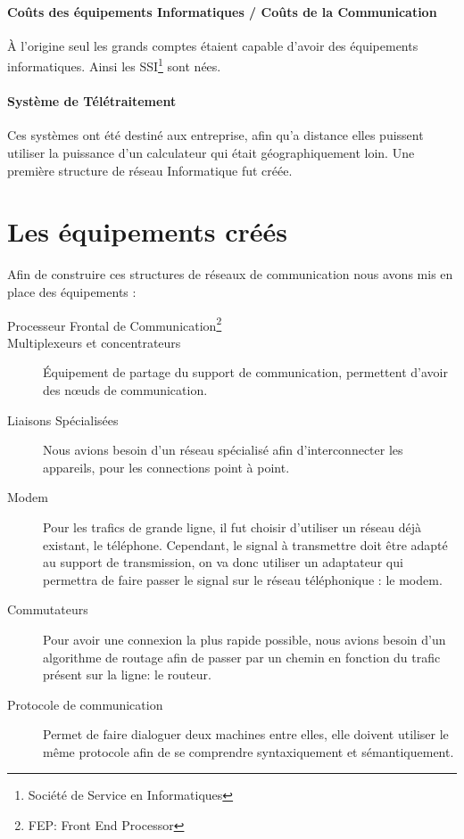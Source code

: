 \documentclass[12pt,a4paper,openany]{book}
\begin{document}
			\paragraph{Coûts des équipements Informatiques / Coûts de la Communication} À l'origine seul les grands comptes étaient capable d'avoir des équipements informatiques. Ainsi les SSI\footnote{Société de Service en Informatiques} sont nées.
			\paragraph{Système de Télétraitement} Ces systèmes ont été destiné aux entreprise, afin qu'a distance elles puissent utiliser la puissance d'un calculateur qui était géographiquement loin. Une première structure de réseau Informatique fut créée.

			\section{Les équipements créés}
			Afin de construire ces structures de réseaux de communication nous avons mis en place des équipements :
			\begin{description}
				\item[Processeur Frontal de Communication\footnote{FEP: Front End Processor}]
				\item[Multiplexeurs et concentrateurs] Équipement de partage du support de communication, permettent d'avoir des nœuds de communication.
				\item[Liaisons Spécialisées] Nous avions besoin d'un réseau spécialisé afin d'interconnecter les appareils, pour les connections point à point.
				\item[Modem] Pour les trafics de grande ligne, il fut choisir d'utiliser un réseau déjà existant, le téléphone.
			Cependant, le signal à transmettre doit être adapté au support de transmission, on va donc utiliser un adaptateur qui permettra de faire 
			passer le signal sur le réseau téléphonique : le modem.
				\item[Commutateurs] Pour avoir une connexion la plus rapide possible, nous avions besoin d'un algorithme de routage afin de passer par un chemin en fonction du trafic présent sur la ligne: le routeur.
				\item[Protocole de communication] Permet de faire dialoguer deux machines entre elles, elle doivent utiliser le même protocole afin de se comprendre syntaxiquement et sémantiquement.
			\end{description}
			
\end{document}
